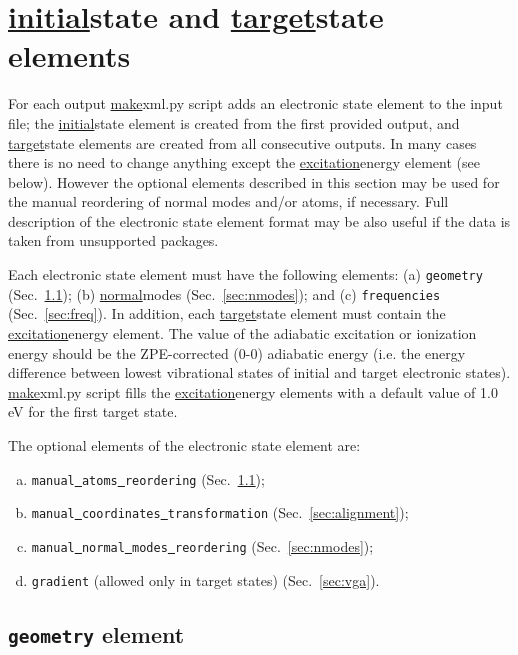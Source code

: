 \documentclass[11pt]{article}
\begin{document}
\section{\ul{initial}{state} and \ul{target}{state} elements}
\label{sec:elstates}

For each \ai output \ul{make}{xml.py} script adds an electronic state element 
to the input  \xml file; the \ul{initial}{state} element is created from the first provided output, 
and \ul{target}{state} elements are created from all consecutive outputs.
In many cases there is no need to change anything except the \ul{excitation}{energy} element (see below).
However the optional elements described in this section may be used for 
the manual reordering of normal modes and/or atoms, if necessary.
Full description of the electronic state element format may be also useful 
if the data is taken from unsupported \ai packages.

Each electronic state element must have the following elements: 
(a) {\tt geometry} (Sec.~\ref{sec:geometry});
(b) \ul{normal}{modes} (Sec.~\ref{sec:nmodes});
and (c) {\tt frequencies} (Sec.~\ref{sec:freq}). 
In addition, each \ul{target}{state} element must contain the \ul{excitation}{energy} element. The value of the adiabatic excitation or ionization energy 
should be the ZPE-corrected (0-0) adiabatic energy (i.e. the energy difference between lowest vibrational states of 
initial and target electronic states). \ul{make}{xml.py} script fills the \ul{excitation}{energy} elements with a default value
of 1.0 eV for the first target state.

The optional elements of the electronic state element are:
\begin{enumerate}[(a)]
\item {\tt manual\underline{~}atoms\underline{~}reordering} (Sec.~\ref{sec:geometry});
\item {\tt manual\underline{~}coordinates\underline{~}transformation} (Sec.~\ref{sec:alignment});
\item {\tt manual\underline{~}normal\underline{~}modes\underline{~}reordering} (Sec.~\ref{sec:nmodes});
\item {\tt gradient} (allowed only in target states) (Sec.~\ref{sec:vga}).
\end{enumerate}

\subsection{\texttt{geometry} element}
\label{sec:geometry}
\end{document}
